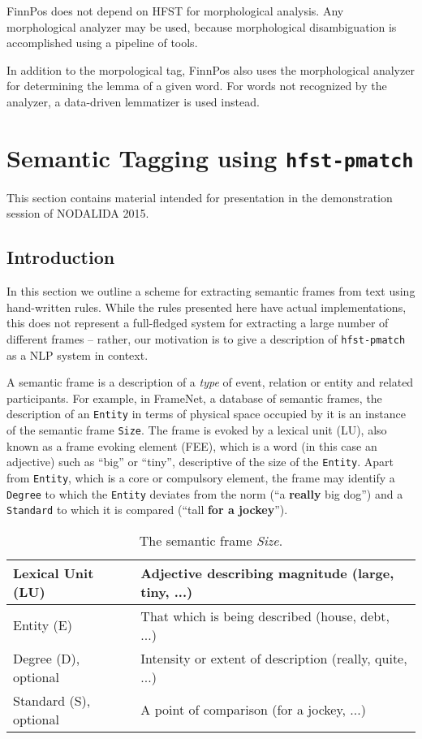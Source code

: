 \documentclass{llncs}
\begin{document}
FinnPos does not depend on HFST for morphological analysis. Any
morphological analyzer may be used, because morphological
disambiguation is accomplished using a pipeline of tools.

In addition to the morpological tag, FinnPos also uses the
morphological analyzer for determining the lemma of a given word. For
words not recognized by the analyzer, a data-driven lemmatizer is used
instead.

\section{Semantic Tagging using {\tt hfst-pmatch}}\label{sec:sem-tagging}

This section contains material intended for presentation in the
demonstration session of NODALIDA 2015.

\subsection{Introduction}

In this section we outline a scheme for extracting semantic frames from text
using hand-written rules. While the rules presented here have actual
implementations, this does not represent a full-fledged system
for extracting a large number of different frames -- rather, our motivation is
to give a description of \verb+hfst-pmatch+ as a NLP system in context.

A semantic frame \cite{semantic-frame} is a description of a \emph{type} of event, relation or entity
and related participants. For example, in FrameNet,
a database of semantic frames,
the description of an \verb+Entity+ in terms of physical space occupied by it is
an instance of the semantic frame \verb+Size+. The frame is evoked by
a lexical unit (LU), also known as a frame evoking element (FEE), which is a
word (in this case an adjective)
such as ``big'' or ``tiny'', descriptive of the size of the \verb+Entity+.
Apart from \verb+Entity+, which is a core or compulsory element, the
frame may identify a \verb+Degree+ to which the \verb+Entity+ deviates
from the norm (``a \textbf{really} big dog'') and a \verb+Standard+ to
which it is compared (``tall \textbf{for a jockey}'').

  \begin{center}
\begin{table}[h]
  \begin{tabular}{ | l | p{4cm} |}
\hline
Lexical Unit (LU) & Adjective describing magnitude (large, tiny, ...) \\
\hline
Entity (E) & That which is being described (house, debt, ...) \\
\hline
Degree (D), optional & Intensity or extent of description
(really, quite, ...) \\
\hline
Standard (S), optional & A point of comparison (for a jockey, ...) \\
\hline
    \end{tabular}
    \caption{The semantic frame \emph{Size}.}
\end{table}
      \end{center}
\end{document}

